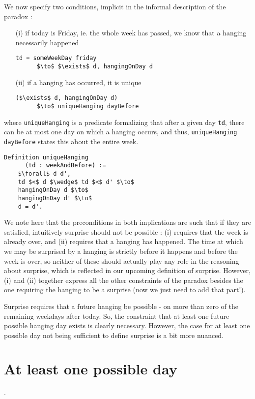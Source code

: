 \documentclass[journal]{journal}
\begin{document}
We now specify two conditions, implicit in the informal
description of the paradox :

\begin{itemize}
  \item[(i)] if today is Friday, ie. the whole
  week has passed, we know that a hanging necessarily happened
  \begin{lstlisting}[mathescape=true]
    td = someWeekDay friday
      $\to$ $\exists$ d, hangingOnDay d
  \end{lstlisting}
  \item[(ii)] if a hanging has occurred, it is unique
  \begin{lstlisting}[mathescape=true]
    ($\exists$ d, hangingOnDay d)
      $\to$ uniqueHanging dayBefore
  \end{lstlisting}
\end{itemize}

where {\tt uniqueHanging} is a predicate formalizing that after a given day {\tt td},
there can be at most one day on which a hanging occurs, and thus,
{\tt uniqueHanging dayBefore} states this about the entire week.

\begin{lstlisting}[mathescape=true]
  Definition uniqueHanging
      (td : weekAndBefore) :=
    $\forall$ d d',
    td $<$ d $\wedge$ td $<$ d' $\to$
    hangingOnDay d $\to$
    hangingOnDay d' $\to$
    d = d'.
\end{lstlisting}

We note here that the preconditions in both implications are such that if
they are satisfied, intuitively surprise should not be possible : (i)
requires that the week is already over, and (ii) requires that a hanging
has happened. The time at which we may be surprised by a hanging is strictly
before it happens and before the week is over, so neither of these should
actually play any role in the reasoning about surprise, which is reflected
in our upcoming definition of surprise. However, (i) and (ii) together express all the
other constraints of the paradox besides the one requiring the hanging to
be a surprise (now we just need to add that part!).

Surprise requires that a future hanging be possible - on more than zero
of the remaining weekdays after today.
So, the constraint that at least one future possible hanging day exists is
clearly necessary. However, the case for at least one possible day not
being sufficient to define surprise is a bit more nuanced.

\section{At least one possible day}.
\label{sec:one}
\end{document}
